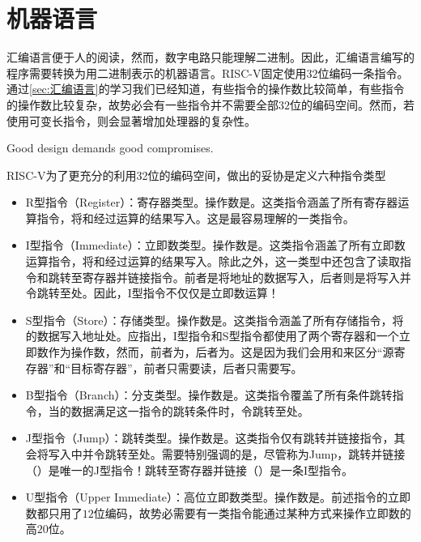 \section{机器语言}

汇编语言便于人的阅读，然而，数字电路只能理解二进制。因此，汇编语言编写的程序需要转换为用二进制表示的机器语言。RISC-V固定使用$32$位编码一条指令。通过\cref{sec:汇编语言}的学习我们已经知道，有些指令的操作数比较简单，有些指令的操作数比较复杂，故势必会有一些指令并不需要全部$32$位的编码空间。然而，若使用可变长指令，则会显著增加处理器的复杂性。
\begin{BoxDesignPrinciple}[好设计需要好妥协]
    \centering
    Good design demands good compromises.
\end{BoxDesignPrinciple}

RISC-V为了更充分的利用32位的编码空间，做出的妥协是定义六种指令类型
\begin{itemize}
    \item R型指令（Register）：寄存器类型。操作数是。这类指令涵盖了所有寄存器运算指令，将和经过运算的结果写入。这是最容易理解的一类指令。
    \item I型指令（Immediate）：立即数类型。操作数是。这类指令涵盖了所有立即数运算指令，将和经过运算的结果写入。除此之外，这一类型中还包含了读取指令和跳转至寄存器并链接指令。前者是将地址的数据写入，后者则是将写入并令跳转至处。因此，I型指令不仅仅是立即数运算！
    \item S型指令（Store）：存储类型。操作数是。这类指令涵盖了所有存储指令，将的数据写入地址处。应指出，I型指令和S型指令都使用了两个寄存器和一个立即数作为操作数，然而，前者为，后者为。这是因为我们会用和来区分“源寄存器”和“目标寄存器”，前者只需要读，后者只需要写。
    \item B型指令（Branch）：分支类型。操作数是。这类指令覆盖了所有条件跳转指令，当的数据满足这一指令的跳转条件时，令跳转至处。
    \item J型指令（Jump）：跳转类型。操作数是。这类指令仅有跳转并链接指令，其会将写入中并令跳转至处。需要特别强调的是，尽管称为Jump，跳转并链接（）是唯一的J型指令！跳转至寄存器并链接（）是一条I型指令。
    \item U型指令（Upper Immediate）：高位立即数类型。操作数是。前述指令的立即数都只用了$12$位编码，故势必需要有一类指令能通过某种方式来操作立即数的高$20$位。
\end{itemize}

